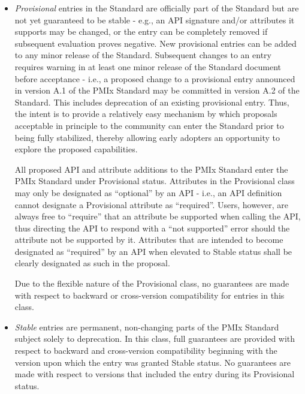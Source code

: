 \documentclass{article}
\begin{document}
\begin{itemize}
\item
  \textit{Provisional} entries in the Standard are officially part
  of the Standard but are not yet guaranteed to be stable - e.g., an API
  signature and/or attributes it supports may be changed, or the entry
  can be completely removed if subsequent evaluation proves negative.
  New provisional entries can be added to any minor release of the
  Standard. Subsequent changes to an entry requires warning in at least
  one minor release of the Standard document before acceptance - i.e., a
  proposed change to a provisional entry announced in version A.1 of the
  PMIx Standard may be committed in version A.2 of the Standard. This
  includes deprecation of an existing provisional entry. Thus, the
  intent is to provide a relatively easy mechanism by which proposals
  acceptable in principle to the community can enter the Standard prior
  to being fully stabilized, thereby allowing early adopters an
  opportunity to explore the proposed capabilities.

  All proposed API and attribute additions to the PMIx Standard enter the PMIx Standard
  under Provisional status. Attributes in the Provisional class may
  only be designated as ``optional'' by an API - i.e., an API definition
  cannot designate a Provisional attribute as ``required''. Users,
  however, are always free to ``require'' that an attribute be supported
  when calling the API, thus directing the API to respond with a ``not
  supported'' error should the attribute not be supported by it.
  Attributes that are intended to become designated as ``required'' by
  an API when elevated to Stable status shall be clearly designated
  as such in the proposal.

  Due to the flexible nature of the Provisional class, no guarantees are
  made with respect to backward or cross-version compatibility for
  entries in this class.
\item
  \textit{Stable} entries are permanent, non-changing parts of the
  PMIx Standard subject solely to deprecation. In this class, full
  guarantees are provided with respect to backward and cross-version
  compatibility beginning with the version upon which the entry was
  granted Stable status. No guarantees are made with respect to
  versions that included the entry during its Provisional status.


\end{itemize}
\end{document}
